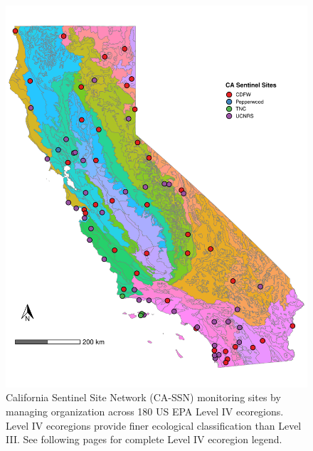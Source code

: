 \documentclass[
  letterpaper,
  DIV=11,
  numbers=noendperiod]{scrartcl}
\begin{document}
\begin{figure}[H]

{\centering \includegraphics[width=1\textwidth,height=\textheight]{01_analyze_files/figure-pdf/map-L4-SSN-1.pdf}

}

\caption{California Sentinel Site Network (CA-SSN) monitoring sites by
managing organization across 180 US EPA Level IV ecoregions. Level IV
ecoregions provide finer ecological classification than Level III. See
following pages for complete Level IV ecoregion legend.}

\end{figure}%
\end{document}
